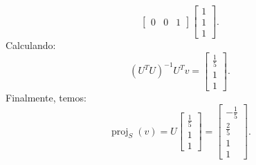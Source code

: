 \begin{resolution}
\begin{enumerate}[label=\alph*)]
\[\begin{bmatrix}
              0           & 0 & 1
            \end{bmatrix} \begin{bmatrix}
              1 \\ 1 \\ 1
            \end{bmatrix}.
          \]
          Calculando:
          \[
            (U^T U)^{-1} U^T v = \begin{bmatrix}
              \frac{1}{5} \\ 1 \\ 1
            \end{bmatrix}.
          \]
          Finalmente, temos:
          \[
            \operatorname{proj}_S(v) = U \begin{bmatrix}
              \frac{1}{5} \\ 1 \\ 1
            \end{bmatrix}
            = \begin{bmatrix}
              -\frac{1}{5} \\ \frac{2}{5} \\ 1 \\ 1
            \end{bmatrix}.
          \]
  \end{enumerate}

\end{resolution}

